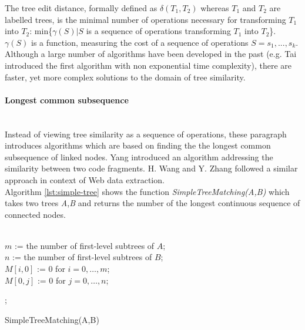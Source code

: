 \documentclass[12pt, notitlepage]{article}
\begin{document}
The tree edit distance, formally defined as $\delta(T_1,T_2)$ whereas $T_1$ and $T_2$ are labelled trees,
is the minimal number of operations necessary for transforming $T_1$ into $T_2$: min\{$\gamma(S)|S$ is a sequence of operations transforming $T_1$ into $T_2$\}. $\gamma(S)$ is a function, measuring the cost of a sequence of operations $S=s_1,...,s_k$. \\
Although a large number of algorithms have been developed in the past (e.g. Tai\cite{tai} introduced the first algorithm with non exponential time complexity), there are faster, yet more complex solutions to the domain of tree similarity. 

\paragraph{Longest common subsequence} ~\\
Instead of viewing tree similarity as a sequence of operations, these paragraph introduces algorithms which are based on finding
the the longest common subsequence of linked nodes. 
Yang\cite{yang} introduced an algorithm addressing the similarity between two code fragments. H. Wang and Y. Zhang\cite{simple-tree-matching} followed a similar approach in context of Web data extraction.\\
Algorithm \ref{lst:simple-tree} shows the function \textit{SimpleTreeMatching(A,B)} which takes two trees \textit{A},\textit{B} and returns the number of the longest continuous sequence of connected nodes.\\ 
\\
\begin{algorithm}[H]
\SetAlgoLined
	$m$ := the number of first-level subtrees of $A$;\\
	$n$ := the number of first-level subtrees of $B$;\\
	$M[i,0]$ := 0 for $i=0,\ldots,m$;\\
	$M[0,j]$ := 0 for $j=0,\ldots,n$;\\
	
	
	;
\caption{SimpleTreeMatching(A,B)\label{lst:simple-tree}}
\end{algorithm}
\end{document}
